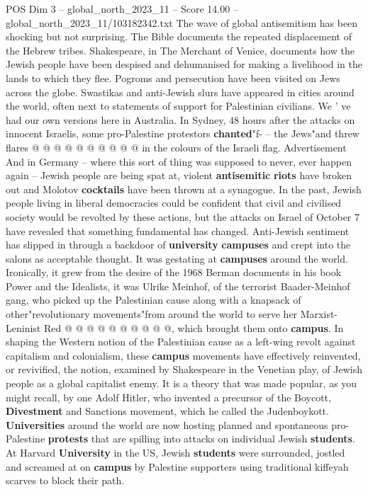 \begin{textsample}{POS Dim 3 – global\_north\_2023\_11 – Score 14.00 – global\_north\_2023\_11/103182342.txt}
The wave of global antisemitism has been shocking but not surprising.
The Bible documents the repeated displacement of the Hebrew tribes.
Shakespeare, in The Merchant of Venice, documents how the Jewish people have been despised and dehumanised for making a livelihood in the lands to which they flee.
Pogroms and persecution have been visited on Jews across the globe.
Swastikas and anti-Jewish slurs have appeared in cities around the world, often next to statements of support for Palestinian civilians.
We ' ve had our own versions here in Australia.
In Sydney, 48 hours after the attacks on innocent Israelis, some pro-Palestine protestors \textbf{chanted}"f- -- the Jews"and threw flares @ @ @ @ @ @ @ @ @ @ in the colours of the Israeli flag.
Advertisement And in Germany -- where this sort of thing was supposed to never, ever happen again -- Jewish people are being spat at, violent \textbf{antisemitic} \textbf{riots} have broken out and Molotov \textbf{cocktails} have been thrown at a synagogue.
In the past, Jewish people living in liberal democracies could be confident that civil and civilised society would be revolted by these actions, but the attacks on Israel of October 7 have revealed that something fundamental has changed.
Anti-Jewish sentiment has slipped in through a backdoor of \textbf{university} \textbf{campuses} and crept into the salons as acceptable thought.
It was gestating at \textbf{campuses} around the world.
Ironically, it grew from the desire of the 1968 Berman documents in his book Power and the Idealists, it was Ulrike Meinhof, of the terrorist Baader-Meinhof gang, who picked up the Palestinian cause along with a knapsack of other"revolutionary movements"from around the world to serve her Marxist-Leninist Red @ @ @ @ @ @ @ @ @ @, which brought them onto \textbf{campus}.
In shaping the Western notion of the Palestinian cause as a left-wing revolt against capitalism and colonialism, these \textbf{campus} movements have effectively reinvented, or revivified, the notion, examined by Shakespeare in the Venetian play, of Jewish people as a global capitalist enemy.
It is a theory that was made popular, as you might recall, by one Adolf Hitler, who invented a precursor of the Boycott, \textbf{Divestment} and Sanctions movement, which he called the Judenboykott. \textbf{Universities} around the world are now hosting planned and spontaneous pro-Palestine \textbf{protests} that are spilling into attacks on individual Jewish \textbf{students}.
At Harvard \textbf{University} in the US, Jewish \textbf{students} were surrounded, jostled and screamed at on \textbf{campus} by Palestine supporters using traditional kiffeyah scarves to block their path.

\end{textsample}
